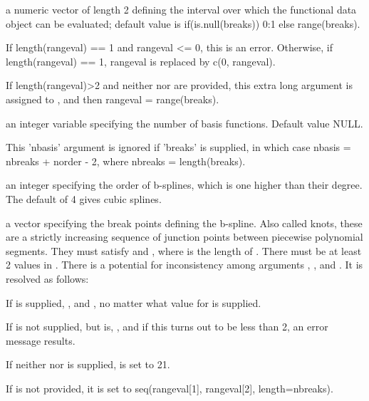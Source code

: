 \begin{Arguments}
\begin{ldescription}
\item[\code{rangeval}] a numeric vector of length 2 defining the interval over
which the functional data object can be evaluated;  default value
is if(is.null(breaks)) 0:1 else range(breaks).  

If length(rangeval) == 1 and rangeval <= 0, this is an error.
Otherwise, if length(rangeval) == 1, rangeval is replaced by c(0,
rangeval).  

If length(rangeval)>2 and neither  nor 
are provided, this extra long  argument is assigned
to , and then rangeval = range(breaks).  

\item[\code{nbasis}] an integer variable specifying the number of basis functions.
Default value NULL.

This 'nbasis' argument is ignored if 'breaks' is supplied, in which
case nbasis = nbreaks + norder - 2, where nbreaks = length(breaks).

\item[\code{norder}] an integer specifying the order of b-splines, which is one higher
than their degree. The default of 4 gives cubic splines.

\item[\code{breaks}] a vector specifying the break points defining the b-spline.
Also called knots, these are a strictly increasing sequence
of junction points between piecewise polynomial segments.
They must satisfy  and
, where  is the 
length of .  There must be at least 2 values in
.  There is a potential for inconsistency among
arguments , , and .  It is
resolved as follows:

If  is supplied, , and
, no matter what value for
 is supplied. 

If  is not supplied, but  is,
, and if this turns out to be
less than 2, an error message results.

If neither  nor  is supplied,
 is set to 21.

If  is not provided, it is set to seq(rangeval[1],
rangeval[2], length=nbreaks).  


\end{ldescription}
\end{Arguments}
